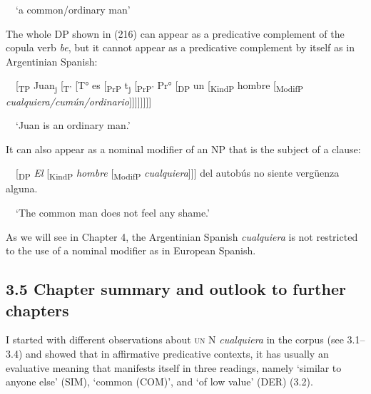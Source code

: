 \begin{styleStandard}
\ \ ‘a common/ordinary man’
\end{styleStandard}

\begin{styleStandard}
The whole DP shown in (216) can appear as a predicative complement of the copula verb \textit{be}, but it cannot appear as a predicative complement by itself as in Argentinian Spanish:
\end{styleStandard}

\begin{styleStandard}
\ \ [\textsubscript{TP }Juan\textsubscript{j} [\textsubscript{T'} [T° es [\textsubscript{PrP} t\textsubscript{j} [\textsubscript{PrP' }Pr°\textsubscript{ }[\textsubscript{DP} un [\textsubscript{KindP} hombre [\textsubscript{ModifP}\textit{ cualquiera/cumún/ordinario}]]]]]]]]
\end{styleStandard}

\begin{styleStandard}
\ \ ‘Juan is an ordinary man.’
\end{styleStandard}

\begin{styleStandard}
It can also appear as a nominal modifier of an NP that is the subject of a clause:
\end{styleStandard}

\begin{styleStandard}
\ \ [\textsubscript{DP} \textit{El} [\textsubscript{KindP }\textit{hombre} [\textsubscript{ModifP }\textit{cualquiera}]]] del autobús no siente vergüenza alguna.
\end{styleStandard}

\begin{styleStandard}
\ \ ‘The common man does not feel any shame.’
\end{styleStandard}

\begin{styleStandard}
As we will see in Chapter 4, the Argentinian Spanish \textit{cualquiera} is not restricted to the use of a nominal modifier as in European Spanish. 
\end{styleStandard}

\subsection[3.5 Chapter summary and outlook to further chapters]{\textbf{3.5 Chapter summary and outlook to further chapters}}
\begin{styleStandard}
I started with different observations about \textsc{un} N \textit{cualquiera} in the corpus (see 3.1–3.4) and showed that in affirmative predicative contexts, it has usually an evaluative meaning that manifests itself in three readings, namely ‘similar to anyone else’ (SIM), ‘common (COM)’, and ‘of low value’ (DER) (3.2). 
\end{styleStandard}

